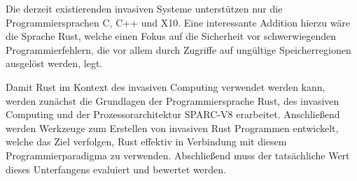 Die derzeit existierenden invasiven Systeme unterstützen nur die Programmiersprachen C, C++ und X10.
Eine interessante Addition hierzu wäre die Sprache Rust,
welche einen Fokus auf die Sicherheit vor schwerwiegenden Programmierfehlern, die vor 
allem durch Zugriffe auf ungültige Speicherregionen ausgelöst werden, legt.

Damit Rust im Kontext des invasiven Computing verwendet werden kann,
werden zunächst die Grundlagen der Programmiersprache Rust,
des invasiven Computing und der Prozessorarchitektur SPARC-V8 erarbeitet. 
Anschließend werden Werkzeuge zum Erstellen von invasiven
Rust Programmen entwickelt, welche das Ziel verfolgen,
Rust effektiv in Verbindung mit diesem Programmierparadigma zu verwenden.
Abschließend muss der tatsächliche Wert dieses Unterfangens evaluiert und bewertet werden.
